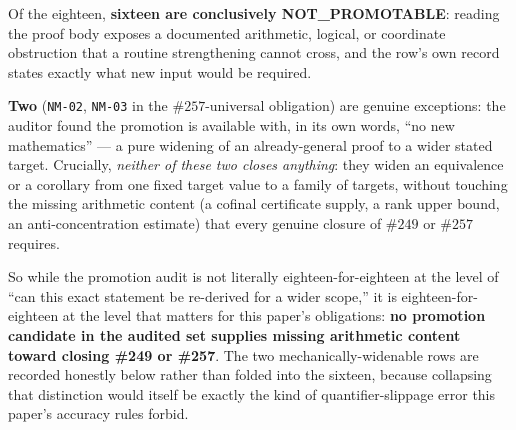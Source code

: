 Of the eighteen, \textbf{sixteen are conclusively NOT\_PROMOTABLE}: reading
the proof body exposes a documented arithmetic, logical, or coordinate
obstruction that a routine strengthening cannot cross, and the row's own
record states exactly what new input would be required.

\textbf{Two}
(\texttt{NM-02}, \texttt{NM-03} in the \(\#257\)-universal obligation) are
genuine exceptions: the auditor found the promotion is available with, in
its own words, ``no new mathematics'' — a pure widening of an already-general
proof to a wider stated target. Crucially, \emph{neither of these two closes
anything}: they widen an equivalence or a corollary from one fixed target
value to a family of targets, without touching the missing arithmetic
content (a cofinal certificate supply, a rank upper bound, an anti-concentration
estimate) that every genuine closure of \(\#249\) or \(\#257\) requires.

So
while the promotion audit is not literally eighteen-for-eighteen at the level
of ``can this exact statement be re-derived for a wider scope,'' it is
eighteen-for-eighteen at the level that matters for this paper's obligations:
\textbf{no promotion candidate in the audited set supplies missing arithmetic
content toward closing \#249 or \#257}. The two mechanically-widenable rows
are recorded honestly below rather than folded into the sixteen, because
collapsing that distinction would itself be exactly the kind of
quantifier-slippage error this paper's accuracy rules forbid.

